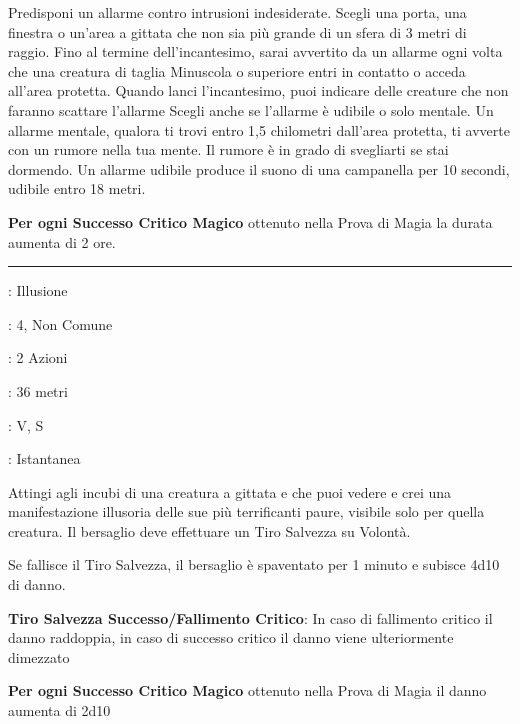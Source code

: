 \begin{multicols}{2}
Predisponi un allarme contro intrusioni indesiderate. Scegli una porta, una finestra o un'area a gittata che non sia più grande di un sfera di 3 metri di raggio. Fino al termine dell'incantesimo, sarai avvertito da un allarme ogni volta che una creatura di taglia Minuscola o superiore entri in contatto o acceda all'area protetta. Quando lanci l'incantesimo, puoi indicare delle creature che non faranno scattare l'allarme Scegli anche se l'allarme è udibile o solo mentale. Un allarme mentale, qualora ti trovi entro 1,5 chilometri dall'area protetta, ti avverte con un rumore nella tua mente. Il rumore è in grado di svegliarti se stai dormendo. Un allarme udibile produce il suono di una campanella per 10 secondi, udibile entro 18 metri.

\textbf{Per ogni Successo Critico Magico} ottenuto nella Prova di Magia la durata aumenta di 2 ore.

\smallskip\noindent\rule{\linewidth}{2pt} \hypertarget{Allucinazione Mortale}{}\medskip{}
\noindent
\begin{description}[noitemsep, topsep=0pt, parsep=0pt, partopsep=0pt, leftmargin=0cm, labelwidth=2.8cm]
\item[\textbf{Lista di Magia}]: Illusione
\item[\textbf{Livello}]: 4, Non Comune
\item[\textbf{T. di Lancio}]: 2 Azioni
\item[\textbf{Gittata}]: 36 metri
\item[\textbf{Componenti}]: V, S
\item[\textbf{Durata}]: Istantanea
\end{description}

Attingi agli incubi di una creatura a gittata e che puoi vedere e crei una manifestazione illusoria delle sue più terrificanti paure, visibile solo per quella creatura. Il bersaglio deve effettuare un Tiro Salvezza su Volontà.

Se fallisce il Tiro Salvezza, il bersaglio è spaventato per 1 minuto e subisce 4d10 di danno.

\textbf{Tiro Salvezza Successo/Fallimento Critico}: In caso di fallimento critico il danno raddoppia, in caso di successo critico il danno viene ulteriormente dimezzato

\textbf{Per ogni Successo Critico Magico} ottenuto nella Prova di Magia il danno aumenta di 2d10


\end{multicols}
